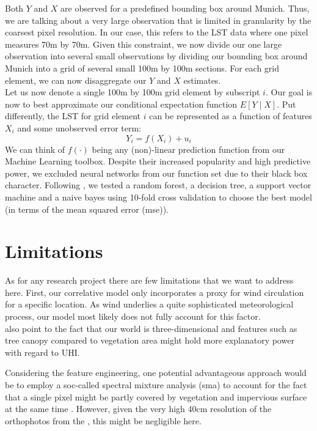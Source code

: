\documentclass[12pt]{article}
\begin{document}
Both $Y$ and $X$ are observed for a predefined bounding box around Munich. Thus, we are talking about a very large observation that is limited in granularity by the coarsest pixel resolution. In our case, this refers to the LST data \citep{ecostress2019} where one pixel measures 70m by 70m. Given this constraint, we now divide our one large observation into several small observations by dividing our bounding box around Munich into a grid of several small 100m by 100m sections. For each grid element, we can now disaggregate our $Y$ and $X$ estimates.\\
Let us now denote a single 100m by 100m grid element by subscript $i$. Our goal is now to best approximate our conditional expectation function $E[ Y \mid X ]$. Put differently, the LST for grid element $i$ can be represented as a function of features $X_i$ and some unobserved error term:
\begin{equation}
Y_i = f(X_i) + u_i
\end{equation}
We can think of $f(\cdot)$ being any (non)-linear prediction function from our Machine Learning toolbox. Despite their increased popularity and high predictive power, we excluded neural networks from our function set due to their black box character. Following \citet{seebacher2019}, we tested a random forest, a decision tree, a support vector machine and a naive bayes using 10-fold cross validation to choose the best model (in terms of the mean squared error (\acrshort{mse})).


\section{Limitations}

As for any research project there are few limitations that we want to address here. First, our correlative model only incorporates a proxy for wind circulation for a specific location. As wind underlies a quite sophisticated meteorological process, our model most likely does not fully account for this factor.\\
\citet{deilami2018} also point to the fact that our world is three-dimensional and features such as tree canopy compared to vegetation area might hold more explanatory power with regard to UHI.

Considering the feature engineering, one potential advantageous approach would be to employ a soc-called spectral mixture analysis (\acrshort{sma}) to account for the fact that a single pixel might be partly covered by vegetation and impervious surface at the same time \citep{ridd1995}. However, given the very high 40cm resolution of the orthophotos from the \citet{bayern2018}, this might be negligible here.
\end{document}
